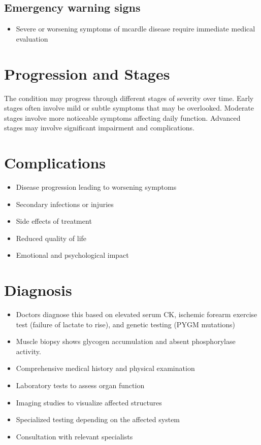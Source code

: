 \subsection{Emergency warning signs}
\begin{itemize}[noitemsep]
  \item Severe or worsening symptoms of mcardle disease require immediate medical evaluation
\end{itemize}
\section{Progression and Stages}
The condition may progress through different stages of severity over time. Early stages often involve mild or subtle symptoms that may be overlooked. Moderate stages involve more noticeable symptoms affecting daily function. Advanced stages may involve significant impairment and complications.
\section{Complications}
\begin{itemize}[noitemsep]
  \item Disease progression leading to worsening symptoms
  \item Secondary infections or injuries
  \item Side effects of treatment
  \item Reduced quality of life
  \item Emotional and psychological impact
\end{itemize}
\section{Diagnosis}
\begin{itemize}[noitemsep]
  \item Doctors diagnose this based on elevated serum CK, ischemic forearm exercise test (failure of lactate to rise), and genetic testing (PYGM mutations)
  \item Muscle biopsy shows glycogen accumulation and absent phosphorylase activity.
  \item Comprehensive medical history and physical examination
  \item Laboratory tests to assess organ function
  \item Imaging studies to visualize affected structures
  \item Specialized testing depending on the affected system
  \item Consultation with relevant specialists
\end{itemize}
